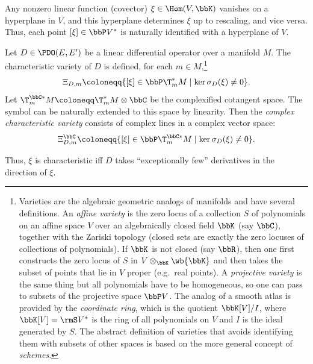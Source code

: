 Any nonzero linear function (covector) $\xi\in\Hom(V,\bbK)$ vanishes on a hyperplane in $V$, and this hyperplane determines $\xi$ up to rescaling, and vice versa. Thus, each point $[\xi]\in \bbP V^\ast$ is naturally identified with a hyperplane of $V$.

\begin{defn}
    Let $D\in\PDO(E,E')$ be a linear differential operator over a manifold $M$. The characteristic variety of $D$ is defined, for each $m\in M$,\footnote{Varieties are the algebraic geometric analogs of manifolds and have several definitions. An \emph{affine variety} is the zero locus of a collection $S$ of polynomials on an affine space $V$ over an algebraically closed field $\bbK$ (say $\bbC$), together with the Zariski topology (closed sets are exactly the zero locuses of collections of polynomials). If $\bbK$ is not closed (say $\bbR$), then one first constructs the zero locus of $S$ in $V\otimes_{\bbK} \wb{\bbK}$ and then takes the subset of points that lie in $V$ proper (e.g.\ real points). A \emph{projective variety} is the same thing but all polynomials have to be homogeneous, so one can pass to subsets of the projective space $\bbP V$. The analog of a smooth atlas is provided by the \emph{coordinate ring}, which is the quotient $\bbK[V]\slash I$, where $\bbK[V]=\rmS V^\ast$ is the ring of all polynomials on $V$ and $I$ is the ideal generated by $S$. The abstract definition of varieties that avoids identifying them with subsets of other spaces is based on the more general concept of \emph{schemes}.}
    \[\Xi_{D,m}\coloneqq \{[\xi]\in \bbP \T^\ast_m M\mid \ker\sigma_D(\xi)\neq 0\}.\]
    Let $\T^{\bbC\ast}_m M\coloneqq \T_m^\ast M\otimes\bbC$ be the complexified cotangent space. The symbol can be naturally extended to this space by linearity. Then the \emph{complex characteristic variety} consists of complex lines in a complex vector space:
    \[\Xi_{D,m}^\bbC\coloneqq \{[\xi]\in \bbP \T^{\bbC\ast}_m M\mid \ker\sigma_D(\xi)\neq 0\}.\]
\end{defn}

Thus, $\xi$ is characteristic iff $D$ takes ``exceptionally few'' derivatives in the direction of $\xi$.

